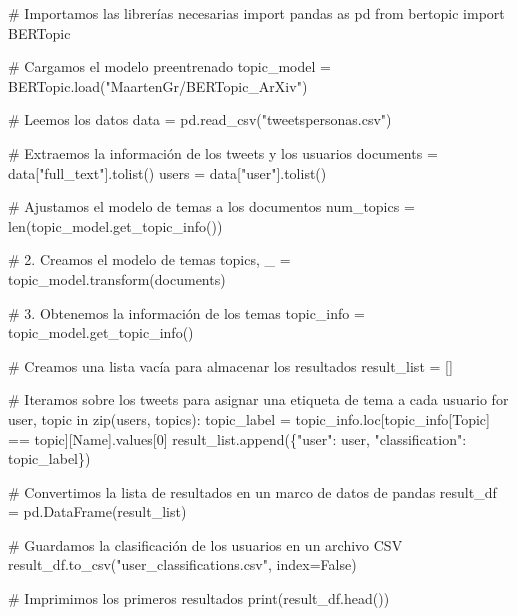 \documentclass[
  letterpaper,
  DIV=11,
  numbers=noendperiod]{scrartcl}
\newenvironment{Shaded}{\begin{snugshade}}{\end{snugshade}}
\newcommand{\BuiltInTok}[1]{\textcolor[rgb]{0.00,0.23,0.31}{#1}}
\newcommand{\CommentTok}[1]{\textcolor[rgb]{0.37,0.37,0.37}{#1}}
\newcommand{\ControlFlowTok}[1]{\textcolor[rgb]{0.00,0.23,0.31}{#1}}
\newcommand{\DecValTok}[1]{\textcolor[rgb]{0.68,0.00,0.00}{#1}}
\newcommand{\ImportTok}[1]{\textcolor[rgb]{0.00,0.46,0.62}{#1}}
\newcommand{\KeywordTok}[1]{\textcolor[rgb]{0.00,0.23,0.31}{#1}}
\newcommand{\NormalTok}[1]{\textcolor[rgb]{0.00,0.23,0.31}{#1}}
\newcommand{\OperatorTok}[1]{\textcolor[rgb]{0.37,0.37,0.37}{#1}}
\newcommand{\StringTok}[1]{\textcolor[rgb]{0.13,0.47,0.30}{#1}}
\newcommand{\VariableTok}[1]{\textcolor[rgb]{0.07,0.07,0.07}{#1}}
\begin{document}
\begin{Shaded}
\begin{Highlighting}[]
\CommentTok{\# Importamos las librerías necesarias}
\ImportTok{import}\NormalTok{ pandas }\ImportTok{as}\NormalTok{ pd}
\ImportTok{from}\NormalTok{ bertopic }\ImportTok{import}\NormalTok{ BERTopic}

\CommentTok{\# Cargamos el modelo preentrenado}
\NormalTok{topic\_model }\OperatorTok{=}\NormalTok{ BERTopic.load(}\StringTok{"MaartenGr/BERTopic\_ArXiv"}\NormalTok{)}

\CommentTok{\# Leemos los datos}
\NormalTok{data }\OperatorTok{=}\NormalTok{ pd.read\_csv(}\StringTok{"tweetspersonas.csv"}\NormalTok{)}

\CommentTok{\# Extraemos la información de los tweets y los usuarios}
\NormalTok{documents }\OperatorTok{=}\NormalTok{ data[}\StringTok{"full\_text"}\NormalTok{].tolist()}
\NormalTok{users }\OperatorTok{=}\NormalTok{ data[}\StringTok{"user"}\NormalTok{].tolist()}

\CommentTok{\# Ajustamos el modelo de temas a los documentos}
\NormalTok{num\_topics }\OperatorTok{=} \BuiltInTok{len}\NormalTok{(topic\_model.get\_topic\_info())}

\CommentTok{\# 2. Creamos el modelo de temas}
\NormalTok{topics, \_ }\OperatorTok{=}\NormalTok{ topic\_model.transform(documents)}

\CommentTok{\# 3. Obtenemos la información de los temas}
\NormalTok{topic\_info }\OperatorTok{=}\NormalTok{ topic\_model.get\_topic\_info()}

\CommentTok{\# Creamos una lista vacía para almacenar los resultados}
\NormalTok{result\_list }\OperatorTok{=}\NormalTok{ []}

\CommentTok{\# Iteramos sobre los tweets para asignar una etiqueta de tema a cada usuario}
\ControlFlowTok{for}\NormalTok{ user, topic }\KeywordTok{in} \BuiltInTok{zip}\NormalTok{(users, topics):}
\NormalTok{    topic\_label }\OperatorTok{=}\NormalTok{ topic\_info.loc[topic\_info[}\StringTok{\textquotesingle{}Topic\textquotesingle{}}\NormalTok{] }\OperatorTok{==}\NormalTok{ topic][}\StringTok{\textquotesingle{}Name\textquotesingle{}}\NormalTok{].values[}\DecValTok{0}\NormalTok{]}
\NormalTok{    result\_list.append(\{}\StringTok{"user"}\NormalTok{: user, }\StringTok{"classification"}\NormalTok{: topic\_label\})}

\CommentTok{\# Convertimos la lista de resultados en un marco de datos de pandas}
\NormalTok{result\_df }\OperatorTok{=}\NormalTok{ pd.DataFrame(result\_list)}

\CommentTok{\# Guardamos la clasificación de los usuarios en un archivo CSV}
\NormalTok{result\_df.to\_csv(}\StringTok{"user\_classifications.csv"}\NormalTok{, index}\OperatorTok{=}\VariableTok{False}\NormalTok{)}

\CommentTok{\# Imprimimos los primeros resultados}
\BuiltInTok{print}\NormalTok{(result\_df.head())}
\end{Highlighting}
\end{Shaded}
\end{document}
